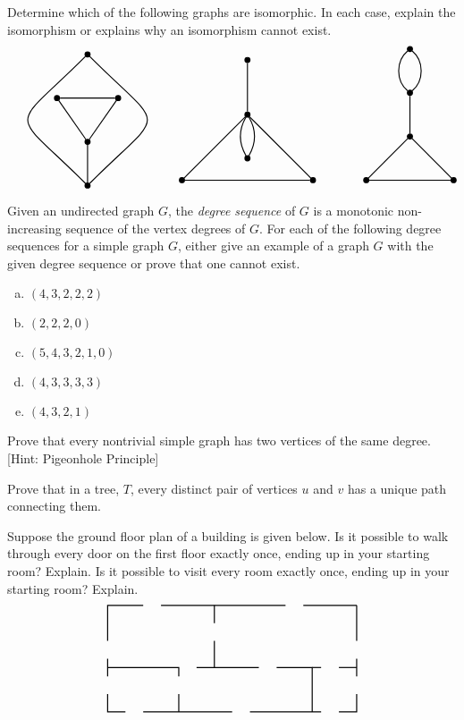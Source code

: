 \documentclass[11pt,letterpaper]{article}
\begin{document}
\newpage





 Determine which of the following graphs are isomorphic. In each case, explain the isomorphism or explains why an isomorphism cannot exist. \pspace
	\[
	\graphThree \quad \graphFour \qquad\qquad \graphFive
	\]





\newpage





 Given an undirected graph $G$, the \textit{degree sequence} of $G$ is a monotonic non-increasing sequence of the vertex degrees of $G$. For each of the following degree sequences for a simple graph $G$, either give an example of a graph $G$ with the given degree sequence or prove that one cannot exist.
	\begin{enumerate}[(a)]
	\item $(4, 3, 2, 2, 2)$
	\item $(2, 2, 2, 0)$
	\item $(5, 4, 3, 2, 1, 0)$ 
	\item $(4, 3, 3, 3, 3)$
	\item $(4, 3, 2, 1)$
	\end{enumerate} \pspace





\newpage





 Prove that every nontrivial simple graph has two vertices of the same degree. [Hint: Pigeonhole Principle] \pspace





\newpage





 Prove that in a tree, $T$, every distinct pair of vertices $u$ and $v$ has a unique path connecting them. \pspace





\newpage





 Suppose the ground floor plan of a building is given below. Is it possible to walk through every door on the first floor exactly once, ending up in your starting room? Explain. Is it possible to visit every room exactly once, ending up in your starting room? Explain. \pspace 
	\[
	\graphSix
	\] \pspace
\end{document}
